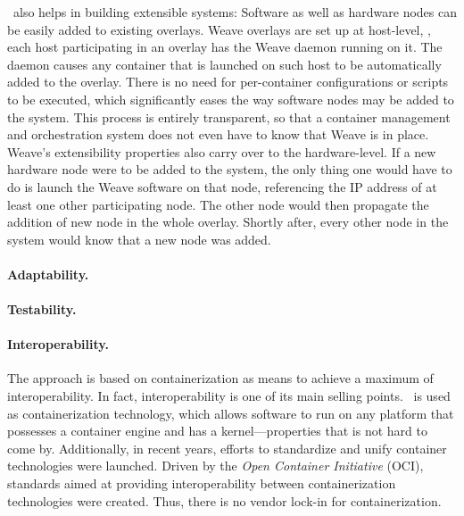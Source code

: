 \wnet\ also helps in building extensible systems: Software as well as hardware nodes can be easily added to existing overlays. Weave overlays are set up at host-level, \ie , each host participating in an overlay has the Weave daemon running on it. The daemon causes any container that is launched on such host to be automatically added to the overlay. There is no need for per-container configurations or scripts to be executed, which significantly eases the way software nodes may be added to the system. This process is entirely transparent, so that a container management and orchestration system does not even have to know that Weave is in place. Weave's extensibility properties also carry over to the hardware-level. If a new hardware node were to be added to the system, the only thing one would  have to do is launch the Weave software on that node, referencing the IP address of at least one other participating node. The other node would then propagate the addition of new node in the whole overlay. Shortly after, every other node in the system would know that a new node was added.


\paragraph{Adaptability.}

\paragraph{Testability.}



\paragraph{Interoperability.}
The approach is based on containerization as means to achieve a maximum of interoperability. In fact, interoperability is one of its main selling points. \docker\ is used as containerization technology, which allows software to run on any platform that possesses a container engine and has a kernel---properties that is not hard to come by. Additionally, in recent years, efforts to standardize and unify container technologies were launched. Driven by the \emph{Open Container Initiative} (OCI), standards aimed at providing interoperability between containerization technologies were created. Thus, there is no vendor lock-in for containerization.

